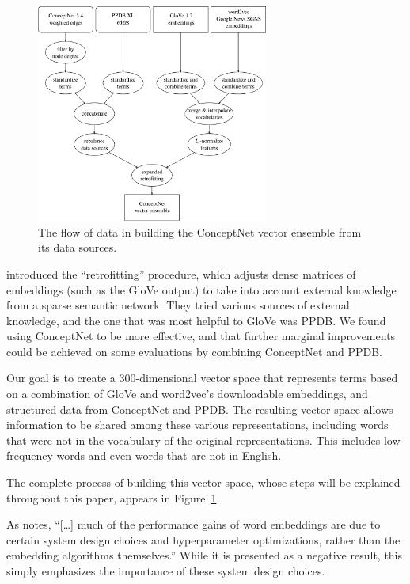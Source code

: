 \documentclass[11pt,letterpaper]{article}
\begin{document}
\begin{figure}
\centering
\includegraphics[width=3.0in]{dataflow.pdf}
\caption{
    The flow of data in building the ConceptNet vector ensemble from its
    data sources.
}
\label{dataflow}
\end{figure}

 introduced the ``retrofitting'' procedure,
which adjusts dense matrices of embeddings (such as the GloVe output) to take
into account external knowledge from a sparse semantic network. They tried
various sources of external knowledge, and the one that was most helpful to
GloVe was PPDB.  We found using ConceptNet to be more effective, and that
further marginal improvements could be achieved on some evaluations by
combining ConceptNet and PPDB.

Our goal is to create a 300-dimensional vector space that represents terms based
on a combination of GloVe and word2vec's downloadable embeddings, and structured
data from ConceptNet and PPDB. The resulting vector space allows information to
be shared among these various representations, including words that were not in
the vocabulary of the original representations. This includes low-frequency words
and even words that are not in English.

The complete process of building this vector space, whose steps will be explained
throughout this paper, appears in Figure~\ref{dataflow}.

As  notes,
``[\ldots] much of the performance gains of word embeddings are due to certain
system design choices and hyperparameter optimizations, rather than the
embedding algorithms themselves.'' While it is presented as a negative result,
this simply emphasizes the importance of these system design choices.
\end{document}
